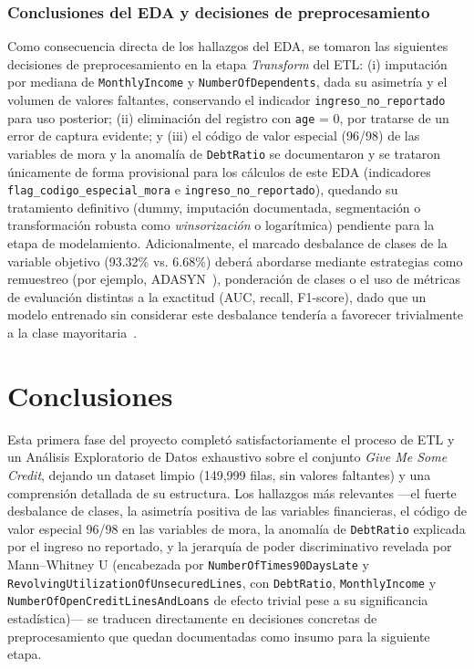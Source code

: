 \documentclass[pdflatex,sn-mathphys-num]{sn-jnl}
\begin{document}
\subsubsection{Conclusiones del EDA y decisiones de preprocesamiento}

Como consecuencia directa de los hallazgos del EDA, se tomaron las siguientes decisiones de preprocesamiento en la etapa \textit{Transform} del ETL: (i) imputación por mediana de \texttt{MonthlyIncome} y \texttt{NumberOfDependents}, dada su asimetría y el volumen de valores faltantes, conservando el indicador \texttt{ingreso\_no\_reportado} para uso posterior; (ii) eliminación del registro con \texttt{age} = 0, por tratarse de un error de captura evidente; y (iii) el código de valor especial (96/98) de las variables de mora y la anomalía de \texttt{DebtRatio} se documentaron y se trataron únicamente de forma provisional para los cálculos de este EDA (indicadores \texttt{flag\_codigo\_especial\_mora} e \texttt{ingreso\_no\_reportado}), quedando su tratamiento definitivo (dummy, imputación documentada, segmentación o transformación robusta como \textit{winsorización} o logarítmica) pendiente para la etapa de modelamiento. Adicionalmente, el marcado desbalance de clases de la variable objetivo (93.32\% vs. 6.68\%) deberá abordarse mediante estrategias como remuestreo (por ejemplo, ADASYN~\cite{chia2025adasyn}), ponderación de clases o el uso de métricas de evaluación distintas a la exactitud (AUC, recall, F1-score), dado que un modelo entrenado sin considerar este desbalance tendería a favorecer trivialmente a la clase mayoritaria~\cite{ichim2025credit}.

\section{Conclusiones}\label{sec:conclusiones}

Esta primera fase del proyecto completó satisfactoriamente el proceso de ETL y un Análisis Exploratorio de Datos exhaustivo sobre el conjunto \textit{Give Me Some Credit}, dejando un dataset limpio (149{,}999 filas, sin valores faltantes) y una comprensión detallada de su estructura. Los hallazgos más relevantes —el fuerte desbalance de clases, la asimetría positiva de las variables financieras, el código de valor especial 96/98 en las variables de mora, la anomalía de \texttt{DebtRatio} explicada por el ingreso no reportado, y la jerarquía de poder discriminativo revelada por Mann--Whitney U (encabezada por \texttt{NumberOfTimes90DaysLate} y \texttt{RevolvingUtilizationOfUnsecuredLines}, con \texttt{DebtRatio}, \texttt{MonthlyIncome} y \texttt{NumberOfOpenCreditLinesAndLoans} de efecto trivial pese a su significancia estadística)— se traducen directamente en decisiones concretas de preprocesamiento que quedan documentadas como insumo para la siguiente etapa.
\end{document}
